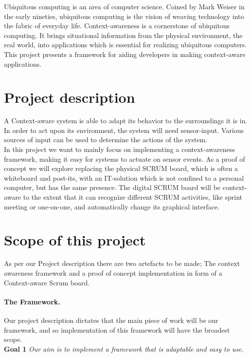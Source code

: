 \documentclass[../report.tex]{subfiles}
\begin{document}
\graphicspath{{img/}{../img/}}
Ubiquitous computing is an area of computer science. Coined by Mark Weiser in the early nineties, ubiquitous computing is the vision of weaving technology into the fabric of everyday life. Context-awareness is a cornerstone of ubiquitous computing. It brings situational information from the physical environment, the real world, into applications which is essential for realizing ubiquitous computers. This project presents a framework for aiding developers in making context-aware applications.

\section{Project description}
A Context-aware system is able to adapt its behavior to the surroundings it is in. In order to act upon its environment, the system will need sensor-input. Various sources of input can be used to determine the actions of the system.\\

In this project we want to mainly focus on implementing a context-awareness framework, making it easy for systems to actuate on sensor events. As a proof of concept we will explore replacing the physical SCRUM board, which is often a whiteboard and post-its, with an IT-solution which is not confined to a personal computer, but has the same presence. The digital SCRUM board will be context-aware to the extent that it can recognize different SCRUM activities, like sprint meeting or one-on-one, and automatically change its graphical interface.


\section{Scope of this project}
\label{scrope}

As per our Project description there are two artefacts to be made; The context awareness framework and a proof of concept implementation in form of a Context-aware Scrum board.

\paragraph{The Framework.} 
Our project description dictates that the main piece of work will be our framework, and so implementation of this framework will have the broadest scope.\\

\textbf{Goal 1} \textit{Our aim is to implement a framework that is adaptable and easy to use.}
\end{document}

